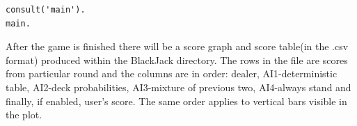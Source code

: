 \documentclass[12pt,a4paper,twocolumn]{article}
\begin{document}
\lstset{language=Prolog}
\begin{lstlisting}[frame=single]
consult('main').
main.
\end{lstlisting}


After the game is finished there will be a score graph and score table(in the .csv format) produced within the BlackJack directory. The rows in the file are scores from particular round and the columns are in order: dealer, AI1-deterministic table, AI2-deck probabilities, AI3-mixture of previous two, AI4-always stand and finally, if enabled, user's score. The same order applies to vertical bars visible in the plot.





\end{document}
